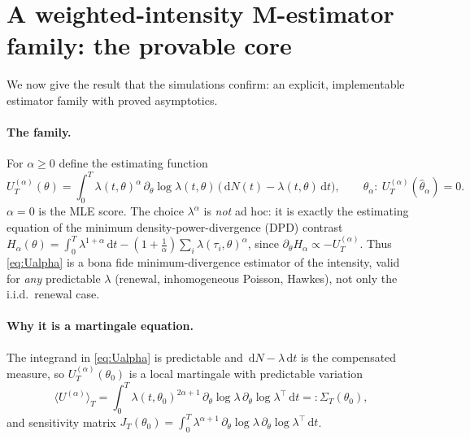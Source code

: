 \documentclass[smallextended,natbib]{svjour3}
\newcommand{\dd}{\,\mathrm{d}}
\begin{document}
\section{A weighted-intensity M-estimator family: the provable core}
\label{sec:mest}
We now give the result that the simulations confirm: an explicit, implementable
estimator family with proved asymptotics.

\paragraph{The family.} For $\alpha\ge0$ define the estimating function
\begin{equation}\label{eq:Ualpha}
U_T^{(\alpha)}(\theta)=\int_0^T \lambda(t,\theta)^{\alpha}\,
\partial_\theta\log\lambda(t,\theta)\,\big(\dd N(t)-\lambda(t,\theta)\dd t\big),
\qquad \hat\theta_\alpha:\ U_T^{(\alpha)}(\hat\theta_\alpha)=0 .
\end{equation}
$\alpha=0$ is the MLE score. The choice $\lambda^{\alpha}$ is \emph{not} ad hoc:
it is exactly the estimating equation of the minimum density-power-divergence
(DPD) contrast \citep{basu1998}
$H_\alpha(\theta)=\int_0^T\!\lambda^{1+\alpha}\dd t-(1+\tfrac1\alpha)\sum_{i}\lambda(\tau_i,\theta)^{\alpha}$,
since $\partial_\theta H_\alpha\propto -U_T^{(\alpha)}$. Thus
\eqref{eq:Ualpha} is a bona fide minimum-divergence estimator of the intensity,
valid for \emph{any} predictable $\lambda$ (renewal, inhomogeneous Poisson,
Hawkes), not only the i.i.d.\ renewal case.

\paragraph{Why it is a martingale equation.} The integrand in \eqref{eq:Ualpha}
is predictable and $\dd N-\lambda\dd t$ is the compensated measure, so
$U_T^{(\alpha)}(\theta_0)$ is a local martingale with predictable variation
\begin{equation}\label{eq:Sigma}
\langle U^{(\alpha)}\rangle_T=\int_0^T \lambda(t,\theta_0)^{2\alpha+1}\,
\partial_\theta\log\lambda\,\partial_\theta\log\lambda^{\!\top}\dd t=:\Sigma_T(\theta_0),
\end{equation}
and sensitivity matrix
$J_T(\theta_0)=\int_0^T \lambda^{\alpha+1}\,\partial_\theta\log\lambda\,
\partial_\theta\log\lambda^{\!\top}\dd t$.
\end{document}

